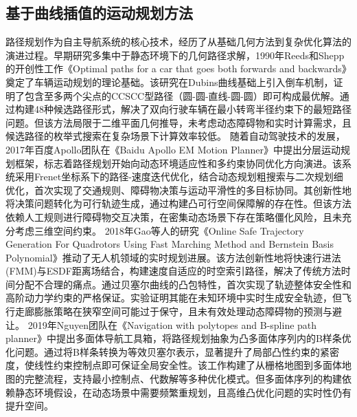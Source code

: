 \documentclass[master,academic]{ysuthesis} %
\begin{document}
		\subsection{基于曲线插值的运动规划方法}
		路径规划作为自主导航系统的核心技术，经历了从基础几何方法到复杂优化算法的演进过程。早期研究多集中于静态环境下的几何路径求解，1990年Reeds和Shepp的开创性工作《Optimal paths for a car that goes both forwards and backwards》奠定了车辆运动规划的理论基础。该研究在Dubins曲线基础上引入倒车机制，证明了包含至多两个尖点的CCSCC型路径（圆-圆-直线-圆-圆）即可构成最优解。通过构建48种候选路径形式，解决了双向行驶车辆在最小转弯半径约束下的最短路径问题。但该方法局限于二维平面几何推导，未考虑动态障碍物和实时计算需求，且候选路径的枚举式搜索在复杂场景下计算效率较低。 随着自动驾驶技术的发展，2017年百度Apollo团队在《Baidu Apollo EM Motion Planner》中提出分层运动规划框架，标志着路径规划开始向动态环境适应性和多约束协同优化方向演进。该系统采用Frenet坐标系下的路径-速度迭代优化，结合动态规划粗搜索与二次规划细优化，首次实现了交通规则、障碍物决策与运动平滑性的多目标协同。其创新性地将决策问题转化为可行轨迹生成，通过构建凸可行空间保障解的存在性。但该方法依赖人工规则进行障碍物交互决策，在密集动态场景下存在策略僵化风险，且未充分考虑三维空间约束。 2018年Gao等人的研究《Online Safe Trajectory Generation For Quadrotors Using Fast Marching Method and Bernstein Basis Polynomial》推动了无人机领域的实时规划进展。该方法创新性地将快速行进法(FMM)与ESDF距离场结合，构建速度自适应的时空索引路径，解决了传统方法时间分配不合理的痛点。通过贝塞尔曲线的凸包特性，首次实现了轨迹整体安全性和高阶动力学约束的严格保证。实验证明其能在未知环境中实时生成安全轨迹，但飞行走廊膨胀策略在狭窄空间可能过于保守，且未有效处理动态障碍物的预测与避让。 2019年Nguyen团队在《Navigation with polytopes and B-spline path planner》中提出多面体导航工具箱，将路径规划抽象为凸多面体序列内的B样条优化问题。通过将B样条转换为等效贝塞尔表示，显著提升了局部凸性约束的紧密度，使线性约束控制点即可保证全局安全性。该工作构建了从栅格地图到多面体地图的完整流程，支持最小控制点、代数解等多种优化模式。但多面体序列的构建依赖静态环境假设，在动态场景中需要频繁重规划，且高维凸优化问题的实时性仍有提升空间。
\end{document}
